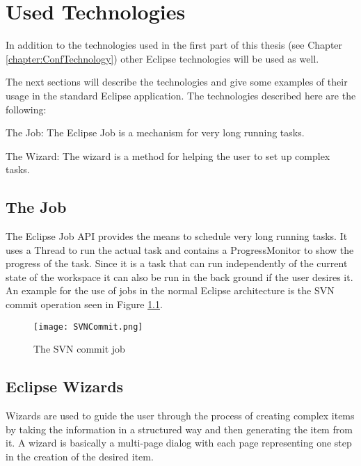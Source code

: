 \chapter{Used Technologies}
\label{chapter:AutoTechnologies}

In addition to the technologies used in the first part of this
thesis (see Chapter \ref{chapter:ConfTechnology}) other Eclipse
technologies will be used as well.

The next sections will describe the technologies and give some
examples of their usage in the standard Eclipse application.
The technologies described here are the following:
\begin{description}
 \item The Job: The Eclipse Job is a mechanism for very long running tasks.
 \item The Wizard: The wizard is a method for helping the user to set up complex tasks.
\end{description}


\section{The Job}
\label{section:AutoTechJob}

The Eclipse Job \ac{API} provides the means to schedule very long running tasks.
It uses a Thread to run the actual task and contains a ProgressMonitor to show
the progress of the task. Since it is a task that can run independently of the
current state of the workspace it can also be run in the back ground if the user
desires it.
An example for the use of jobs in the normal Eclipse architecture
is the SVN commit operation seen in Figure \ref{fig:SVNCommit}.

\begin{figure}[H]
  \centering
  \texttt{[image: SVNCommit.png]}
  \caption[The SVN commit job]%
  {The SVN commit job\protect}
  \label{fig:SVNCommit}
\end{figure}

\section{Eclipse Wizards}
\label{section:AutoTechWizards}
Wizards are used to guide the user through the process of creating complex items by taking
the information in a structured way and then generating the item from it. A wizard is 
basically a multi-page dialog with each page representing one step in the creation of the 
desired item.

